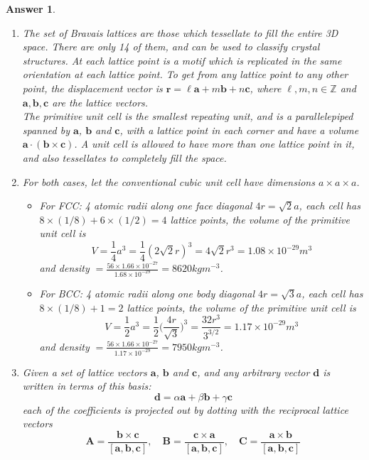 \documentclass[a4paper]{article}
\newtheorem{ans}{Answer}[subsection]
\theoremstyle{new}
\begin{document}
\begin{ans}\leavevmode
\begin{enumerate}[label=(\alph*)]
\item The set of Bravais lattices are those which tessellate to fill the entire 3D space. There are only 14 of them, and can be used to classify crystal structures. At each lattice point is a motif which is replicated in the same orientation at each lattice point. To get from any lattice point to any other point, the displacement vector is $\mathbf{r}=\ell\mathbf{a}+m\mathbf{b}+n\mathbf{c}$, where $\ell,m,n\in\mathbb{Z}$ and $\mathbf{a},\mathbf{b},\mathbf{c}$ are the lattice vectors.\\[5pt]
The primitive unit cell is the smallest repeating unit, and is a parallelepiped spanned by $\mathbf{a}$, $\mathbf{b}$ and $\mathbf{c}$, with a lattice point in each corner and have a volume $\mathbf{a}\cdot(\mathbf{b}\times\mathbf{c})$. A unit cell is allowed to have more than one lattice point in it, and also tessellates to completely fill the space.
\item For both cases, let the conventional cubic unit cell have dimensions $a\times a \times a$. 
\begin{itemize}
    \item For FCC: 4 atomic radii along one face diagonal $4r=\sqrt{2}a$, each cell has $8\times(1/8)+6\times(1/2)=4$ lattice points, the volume of the primitive unit cell is 
    $$V=\frac{1}{4}a^3=\frac{1}{4}(2\sqrt{2}r)^3=4\sqrt{2}r^3=1.08\times10^{-29}m^3$$
    and density $=\frac{56\times1.66\times10^{-27}}{1.68\times10^{-29}}=8620 kgm^{-3}$.
    \item For BCC: 4 atomic radii along one body diagonal $4r=\sqrt{3}a$, each cell has $8\times(1/8)+1=2$ lattice points, the volume of the primitive unit cell is
    $$V=\frac{1}{2}a^3=\frac{1}{2}\bigg(\frac{4r}{\sqrt{3}}\bigg)^3=\frac{32r^3}{3^{3/2}}=1.17\times10^{-29}m^3$$
    and density $=\frac{56\times1.66\times10^{-27}}{1.17\times10^{-29}}=7950 kgm^{-3}$.
\end{itemize}
\item Given a set of lattice vectors $\mathbf{a}$, $\mathbf{b}$ and $\mathbf{c}$, and any arbitrary vector $\mathbf{d}$ is written in terms of this basis:
$$\mathbf{d}=\alpha\mathbf{a}+\beta\mathbf{b}+\gamma\mathbf{c}$$
each of the coefficients is projected out by dotting with the reciprocal lattice vectors
$$\mathbf{A}=\frac{\mathbf{b}\times\mathbf{c}}{[\mathbf{a},\mathbf{b},\mathbf{c}]},\quad\mathbf{B}=\frac{\mathbf{c}\times\mathbf{a}}{[\mathbf{a},\mathbf{b},\mathbf{c}]},\quad\mathbf{C}=\frac{\mathbf{a}\times\mathbf{b}}{[\mathbf{a},\mathbf{b},\mathbf{c}]}$$

\end{enumerate}
\end{ans}
\end{document}
